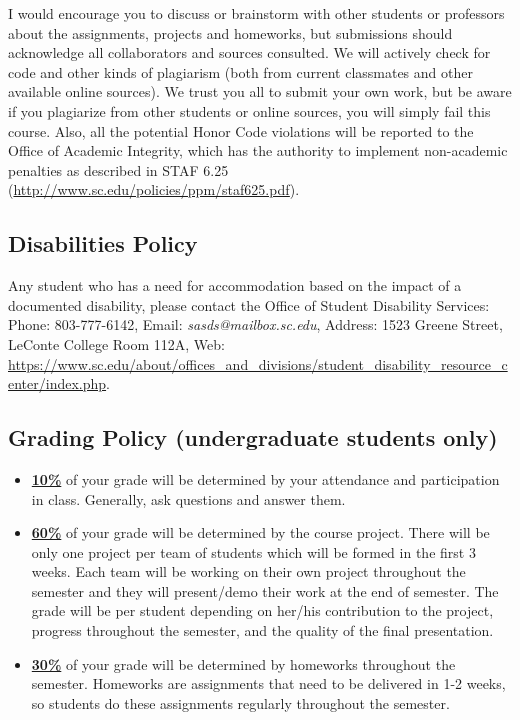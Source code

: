 \documentclass[11pt]{article}
\begin{document}
I would encourage you to discuss or brainstorm with other students or professors about the assignments, projects and homeworks, but submissions should acknowledge all collaborators and sources consulted. We will actively check for code and other kinds of plagiarism (both from current classmates and other available online sources). We trust you all to submit your own work, but be aware if you plagiarize from other students or online sources, you will simply fail this course. Also, all the potential Honor Code violations will be reported to the Office of Academic Integrity, which has the authority to implement non-academic penalties as described in STAF 6.25 (\url{http://www.sc.edu/policies/ppm/staf625.pdf}).

\subsection*{Disabilities Policy}

Any student who has a need for accommodation based on the impact of
a documented disability, please contact the Office of Student Disability Services: Phone: 803-777-6142, Email: \textit{sasds@mailbox.sc.edu}, Address: 1523 Greene Street, LeConte College Room 112A, Web: \url{https://www.sc.edu/about/offices_and_divisions/student_disability_resource_center/index.php}.

\subsection*{Grading Policy (undergraduate students only)}
\begin{itemize}
  \item \underline{\textbf{10\%}} of your grade will be determined by your attendance and participation in class. Generally, ask questions and answer them.

  \item \underline{\textbf{60\%}} of your grade will be determined by the course project. There will be only one project per team of students which will be formed in the first 3 weeks. Each team will be working on their own project throughout the semester and they will present/demo their work at the end of semester. The grade will be per student depending on her/his contribution to the project, progress throughout the semester, and the quality of the final presentation.

  \item \underline{\textbf{30\%}} of your grade will be determined by homeworks throughout the semester. Homeworks are assignments that need to be delivered in 1-2 weeks, so students do these assignments regularly throughout the semester.

\end{itemize}
\end{document}
